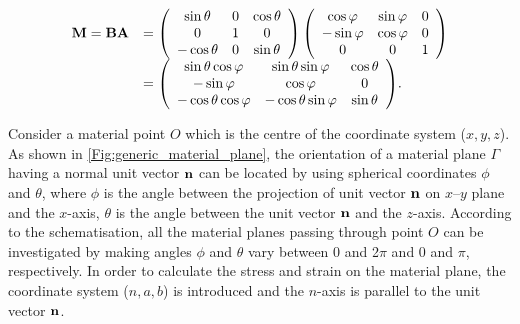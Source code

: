 \begin{eqnarray}
\begin{array}{*{20}{l}}
{{\bf{M}} = {\bf{BA}}}&{ = \left( {\begin{array}{*{20}{c}}
{\sin \theta }&0&{\cos \theta }\\
0&1&0\\
{ - \cos \theta }&0&{\sin \theta }
\end{array}} \right)\left( {\begin{array}{*{20}{c}}
{\cos \varphi }&{\sin \varphi }&0\\
{ - \sin \varphi }&{\cos \varphi }&0\\
0&0&1
\end{array}} \right)}\\
{}&{ = \left( {\begin{array}{*{20}{c}}
{\sin \theta \cos \varphi }&{\sin \theta \sin \varphi }&{\cos \theta }\\
{ - \sin \varphi }&{\cos \varphi }&0\\
{ - \cos \theta \cos \varphi }&{ - \cos \theta \sin \varphi }&{\sin \theta }
\end{array}} \right)}.
\end{array}
\label{Equ:transformation_matrix}
\end{eqnarray}

Consider a material point $O$ which is the centre of the coordinate system ($x,y,z$). As shown in \ref{Fig:generic_material_plane}, the orientation of a material plane $\Gamma$ having a normal unit vector ${\bf{n}}$ can be located by using spherical coordinates $\phi$ and $\theta$, where $\phi$ is the angle between the projection of unit vector ${\bf{n}}$ on $x–y$ plane and the $x$-axis, $\theta$ is the angle between the unit vector ${\bf{n}}$ and the $z$-axis. According to the schematisation, all the material planes passing through point $O$ can be investigated by making angles $\phi$ and $\theta$ vary between 0 and 2$\pi$ and 0 and $\pi$, respectively. In order to calculate the stress and strain on the material plane, the coordinate system ($n,a,b$) is introduced and the $n$-axis is parallel to the unit vector ${\bf{n}}$.


